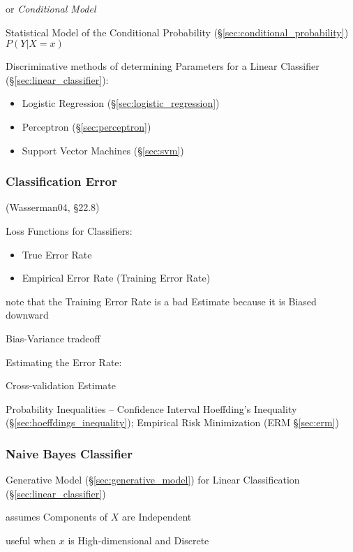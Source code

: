 or \emph{Conditional Model}

Statistical Model of the Conditional Probability
(\S\ref{sec:conditional_probability}) $P(Y | X = x)$

Discriminative methods of determining Parameters for a Linear Classifier
(\S\ref{sec:linear_classifier}):
\begin{itemize}
  \item Logistic Regression (\S\ref{sec:logistic_regression})
  \item Perceptron (\S\ref{sec:perceptron})
  \item Support Vector Machines (\S\ref{sec:svm})
\end{itemize}



\subsubsection{Classification Error}\label{sec:classification_error}

(Wasserman04, \S22.8)

Loss Functions for Classifiers:
\begin{itemize}
  \item True Error Rate
  \item Empirical Error Rate (Training Error Rate)
\end{itemize}

note that the Training Error Rate is a bad Estimate because it is Biased
downward

Bias-Variance tradeoff

Estimating the Error Rate:

Cross-validation Estimate

Probability Inequalities -- Confidence Interval \fist Hoeffding's Inequality
(\S\ref{sec:hoeffdings_inequality}); Empirical Risk Minimization (ERM
\S\ref{sec:erm})



\subsubsection{Naive Bayes Classifier}\label{sec:naive_bayes}

Generative Model (\S\ref{sec:generative_model}) for Linear Classification
(\S\ref{sec:linear_classifier})

assumes Components of $X$ are Independent

useful when $x$ is High-dimensional and Discrete



